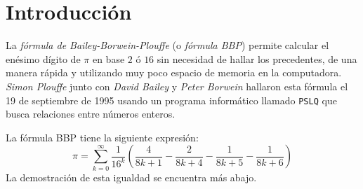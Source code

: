 
\section{Introducción}

La \textit{fórmula de Bailey-Borwein-Plouffe} (o \textit{fórmula BBP})
permite calcular el enésimo dígito de $\pi$ en base $2$ ó $16$ sin
necesidad de hallar los precedentes, de una manera rápida y utilizando
muy poco espacio de memoria en la computadora. \textit{Simon Plouffe}
junto con \textit{David Bailey} y \textit{Peter Borwein} hallaron esta
fórmula el 19 de septiembre de 1995 usando un programa informático
llamado \texttt{PSLQ} que busca relaciones entre números enteros.

La fórmula BBP tiene la siguiente expresión:
\begin{equation*}
  \pi = \sum_{k=0}^{\infty}\frac{1}{16^{k}}
  \left(
    \frac{4}{8k+1}
    -\frac{2}{8k+4}
    -\frac{1}{8k+5}
    -\frac{1}{8k+6}
  \right)
\end{equation*}
La demostración de esta igualdad se encuentra más abajo.
